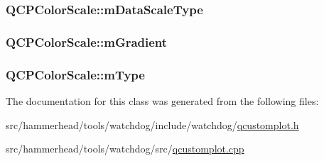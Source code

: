 \subsubsection[{\texorpdfstring{m\+Data\+Scale\+Type}{mDataScaleType}}]{ Q\+C\+P\+Color\+Scale\+::m\+Data\+Scale\+Type\hspace{0.3cm}{\ttfamily [protected]}}\hypertarget{classQCPColorScale_a2754d6a78736f64a241e333fbd955372}{}\label{classQCPColorScale_a2754d6a78736f64a241e333fbd955372}
\subsubsection[{\texorpdfstring{m\+Gradient}{mGradient}}]{ Q\+C\+P\+Color\+Scale\+::m\+Gradient\hspace{0.3cm}{\ttfamily [protected]}}\hypertarget{classQCPColorScale_ae195a385032066b5c46cc3301af58922}{}\label{classQCPColorScale_ae195a385032066b5c46cc3301af58922}
\subsubsection[{\texorpdfstring{m\+Type}{mType}}]{ Q\+C\+P\+Color\+Scale\+::m\+Type\hspace{0.3cm}{\ttfamily [protected]}}\hypertarget{classQCPColorScale_a7d47ed4ab76f38e50164e9d77fe33789}{}\label{classQCPColorScale_a7d47ed4ab76f38e50164e9d77fe33789}


The documentation for this class was generated from the following files\+:\begin{DoxyCompactItemize}
\item 
src/hammerhead/tools/watchdog/include/watchdog/\hyperlink{qcustomplot_8h}{qcustomplot.\+h}\item 
src/hammerhead/tools/watchdog/src/\hyperlink{qcustomplot_8cpp}{qcustomplot.\+cpp}\end{DoxyCompactItemize}
